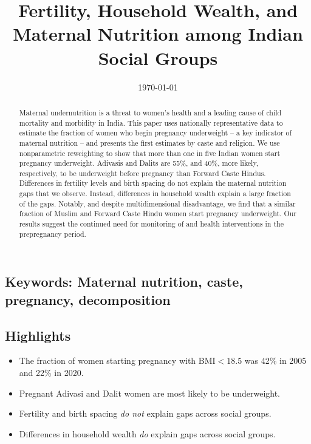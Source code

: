 \documentclass[12pt]{article}
\begin{document}
\RaggedRight
 
\title{Fertility, Household Wealth, and Maternal Nutrition among Indian Social Groups} 
\date{\today} 
\maketitle
   
\begin{abstract}
Maternal undernutrition is a threat to women’s health and a leading cause of child mortality and morbidity in India. This paper uses nationally representative data to estimate the fraction of women who begin pregnancy underweight -- a key indicator of maternal nutrition -- and presents the first estimates by caste and religion.  We use nonparametric reweighting to show that more than one in five Indian women start pregnancy underweight.  Adivasis and Dalits are 55\%, and 40\%, more likely, respectively, to be underweight before pregnancy than Forward Caste Hindus. Differences in fertility levels and birth spacing do not explain the maternal nutrition gaps that we observe.  Instead, differences in household wealth explain a large fraction of the gaps. Notably, and despite multidimensional disadvantage, we find that a similar fraction of Muslim and Forward Caste Hindu women start pregnancy underweight.  Our results suggest the continued need for monitoring of and health interventions in the prepregnancy period.
\end{abstract}

\subsection*{\textbf{Keywords:} Maternal nutrition, caste, pregnancy, decomposition}

\subsection*{Highlights}
{
\begin{itemize}
    \item The fraction of women starting pregnancy with BMI$<18.5$ was 42\% in 2005 and 22\% in 2020.
    \item Pregnant Adivasi and Dalit women are most likely to be underweight.
    \item Fertility and birth spacing \emph{do not} explain gaps across social groups.
    \item Differences in household wealth \emph{do} explain gaps across social groups.
\end{itemize}
}
\newpage
\doublespacing
\end{document}
